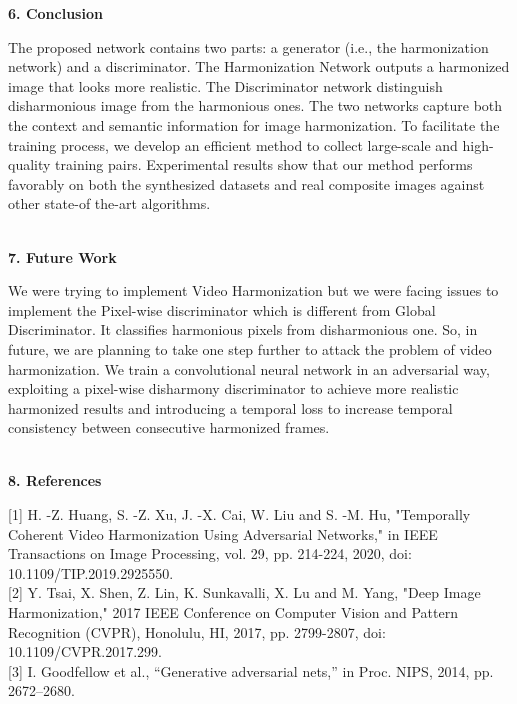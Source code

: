 \documentclass{article}
\begin{document}
\begin{center}
\end{center}
\begin{center}
\end{center}

\begin{flushleft}
\textbf{\large 6. Conclusion}
\end{flushleft}

The proposed network contains two parts: a generator (i.e., the harmonization network) and a discriminator.
The Harmonization Network outputs a harmonized image that looks more realistic.
The Discriminator network distinguish disharmonious image from the harmonious ones. The two networks capture both the context and semantic information for image
harmonization. To facilitate the training process, we develop an efficient method to collect large-scale and high-quality training pairs. Experimental results show that our method performs favorably on both the synthesized datasets and real composite images against other state-of the-art algorithms.\\\\ 

\begin{flushleft}
\textbf{\large 7. Future Work}
\end{flushleft}

We were trying to implement Video Harmonization but we were facing issues to implement the Pixel-wise discriminator which is different from Global Discriminator. It classifies harmonious pixels from disharmonious one. So, in future, we are planning to take one step further to attack the problem
of video harmonization. We train a convolutional neural network in an adversarial way, exploiting a pixel-wise disharmony discriminator to achieve more realistic harmonized results and introducing a temporal loss to increase temporal consistency between consecutive harmonized frames.
\\\\




\begin{flushleft}
\textbf{\large 8. References}
\end{flushleft}

[1] H. -Z. Huang, S. -Z. Xu, J. -X. Cai, W. Liu and S. -M. Hu, "Temporally Coherent Video Harmonization Using Adversarial Networks," in IEEE Transactions on Image Processing, vol. 29, pp. 214-224, 2020, doi: 10.1109/TIP.2019.2925550.\\

[2] Y. Tsai, X. Shen, Z. Lin, K. Sunkavalli, X. Lu and M. Yang, "Deep Image Harmonization," 2017 IEEE Conference on Computer Vision and Pattern Recognition (CVPR), Honolulu, HI, 2017, pp. 2799-2807, doi: 10.1109/CVPR.2017.299.\\

[3] I. Goodfellow et al., “Generative adversarial nets,” in Proc. NIPS, 2014,
pp. 2672–2680.
\end{document}
